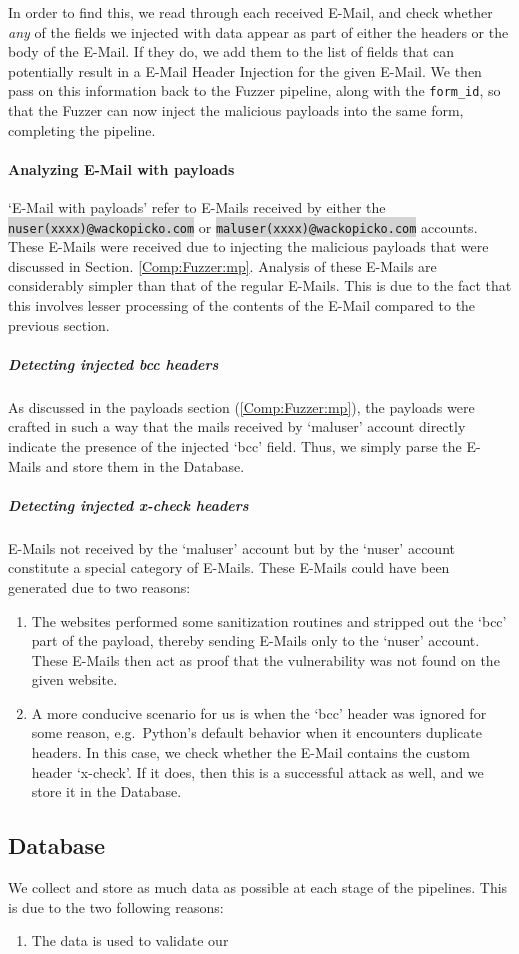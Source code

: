	In order to find this, we read through each received E-Mail, and check whether \emph{any} of the fields we injected with data appear as part of either the headers or the body of the E-Mail. If they do, we add them to the list of fields that can potentially result in a E-Mail Header Injection for the given E-Mail. We then pass on this information back to the Fuzzer pipeline, along with the \lstinline{form_id}, so that the Fuzzer can now inject the malicious payloads into the same form, completing the pipeline.
	
	\paragraph{Analyzing E-Mail with payloads}
	`E-Mail with payloads' refer to E-Mails received by either the \colorbox{lightgray}{\lstinline{nuser(xxxx)@wackopicko.com}} or \colorbox{lightgray}{\lstinline{maluser(xxxx)@wackopicko.com}} accounts. These E-Mails were received due to injecting the malicious payloads that were discussed in Section. \ref{Comp:Fuzzer:mp}. Analysis of these E-Mails are considerably simpler than that of the regular E-Mails. This is due to the fact that this involves lesser processing of the contents of the E-Mail compared to the previous section.
		\subparagraph{Detecting injected bcc headers}
		As discussed in the payloads section (\ref{Comp:Fuzzer:mp}), the payloads were crafted in such a way that the mails received by `maluser' account directly indicate the presence of the injected `bcc' field. Thus, we simply parse the E-Mails and store them in the Database.
		
		\subparagraph{Detecting injected x-check headers}
		E-Mails not received by the `maluser' account but by the `nuser' account constitute a special category of E-Mails.
		These E-Mails could have been generated due to two reasons:
		\begin{enumerate}
			\item The websites performed some sanitization routines and stripped out the `bcc' part of the payload, thereby sending E-Mails only to the `nuser' account. These E-Mails then act as proof that the vulnerability was not found on the given website.
			\item A more conducive scenario for us is when the `bcc' header was ignored for some reason, e.g.\ Python's default behavior when it encounters duplicate headers. In this case, we check whether the E-Mail contains the custom header `x-check'. If it does, then this is a successful attack as well, and we store it in the Database.
		\end{enumerate}
\subsection{Database}
	We collect and store as much data as possible at each stage of the pipelines. This is due to the two following reasons:
	\begin{enumerate}
		\item The data is used to validate our 
	\end{enumerate}
